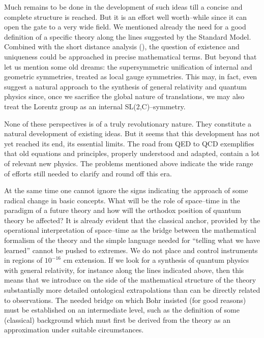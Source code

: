 Much remains to be done in the development of such
ideas till a concise and complete structure is reached. But it is an
effort well worth--while since it can open the gate to a very wide
field. We mentioned already the need for a good definition of a
specific theory along the lines suggested by the Standard Model.
Combined with the short distance analysis 
(\seceig), the question of existence and uniqueness could be
approached in precise mathematical terms. But beyond that let us 
mention some old dreams: the supersymmetric unification of internal
and geometric symmetries, treated as local gauge symmetries. 
This may, in fact, even suggest a natural approach to the synthesis of
general relativity and quantum physics since, once we sacrifice 
the global nature of translations, we may also treat the 
Lorentz group as an internal SL(2,C)--symmetry. 

None of these perspectives is of a truly revolutionary nature. They
constitute a natural development of existing ideas. But it seems that 
this development has not yet reached its end, its essential limits.
The road from QED to QCD exemplifies that old equations and
principles, properly understood and adapted, contain a lot of relevant
new physics. The problems mentioned above indicate the wide range 
of efforts still needed to clarify and round off this era. 

At the same time one cannot ignore the signs indicating the approach
of some radical change in basic concepts. What will be the role of 
space--time in the paradigm of a future theory and how will the
orthodox position of quantum theory be affected? It is already evident
that the classical anchor, provided by the operational interpretation
of space--time as the bridge between the mathematical formalism of the
theory and the simple language needed for ``telling what we have 
learned'' cannot be pushed to extremes. We do not place and control
instruments in regions of $10^{-16}$ cm extension. If we look for
a synthesis of quantum physics with general relativity, for instance
along the lines indicated above, then this means that we introduce on
the side of the mathematical structure of the theory substantially
more detailed ontological extrapolations than can be directly related
to observations. The needed bridge on which Bohr insisted (for good
reasons) must be established on an intermediate level, such as the 
definition of some (classical) background which must first be derived 
from the theory as an approximation under suitable circumstances. 


